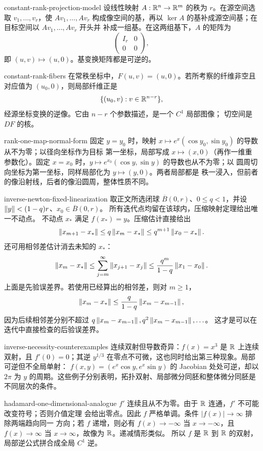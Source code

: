 \begin{solution}{constant-rank-projection-model}
设线性映射 $A:\mathbb{R}^n\to\mathbb{R}^m$ 的秩为 $r$。在源空间选取
$v_1,\ldots,v_r$，使 $Av_1,\ldots,Av_r$ 构成像空间的基，再以
$\ker A$ 的基补成源空间基；在目标空间以 $Av_1,\ldots,Av_r$ 开头并
补成一组基。在这两组基下，$A$ 的矩阵为
\[
 \begin{pmatrix}I_r&0\\0&0\end{pmatrix},
\]
即 $(u,v)\mapsto(u,0)$。基变换矩阵都是可逆的。
\end{solution}

\begin{solution}{constant-rank-fibers}
在常秩坐标中，$F(u,v)=(u,0)$。若所考察的纤维非空且对应值为
$(u_0,0)$，则局部纤维正是
\[
 \{(u_0,v):v\in\mathbb{R}^{n-r}\},
\]
经源坐标变换的逆像。它由 $n-r$ 个参数描述，是一个 $C^1$ 局部图像；
切空间是 $DF$ 的核。
\end{solution}

\begin{solution}{rank-one-map-normal-form}
固定 $y=y_0$ 时，映射
$x\mapsto e^x(\cos y_0,\sin y_0)$ 的导数从不为零；以径向坐标作为目标
第一坐标，局部写成 $x\mapsto(x,0)$（再作一维重参数化）。固定
$x=x_0$ 时，$y\mapsto e^{x_0}(\cos y,\sin y)$ 的导数也从不为零；以
圆周切向坐标为第一坐标，同样局部化为 $y\mapsto(y,0)$。两者局部都是
秩一浸入，但前者的像沿射线，后者的像沿圆周，整体性质不同。
\end{solution}

\begin{solution}{inverse-newton-fixed-linearization}
取正文所选闭球 \(\overline B(0,r)\)、\(0\le q<1\)，并设
\(\left\lVert y\right\rVert<(1-q)r\)、\(x_0\in\overline B(0,r)\)。
所有迭代点均留在该球内，压缩映射定理给出唯一不动点。
不动点 $x_*$ 满足 $f(x_*)=y$。压缩估计直接给出
\[
 \left\lVert x_{m+1}-x_*\right\rVert\le q\left\lVert x_m-x_*\right\rVert\le q^{m+1}\left\lVert x_0-x_*\right\rVert.
\]
还可用相邻差估计消去未知的 $x_*$：
\[
 \left\lVert x_m-x_*\right\rVert
 \le\sum_{j=m}^{\infty}\left\lVert x_{j+1}-x_j\right\rVert
 \le\frac{q^m}{1-q}\left\lVert x_1-x_0\right\rVert.
\]
上面是先验误差界。若使用已经算出的相邻差，则对 \(m\ge1\)，
\[
 \left\lVert x_m-x_*\right\rVert\le\frac{q}{1-q}\left\lVert x_m-x_{m-1}\right\rVert,
\]
因为后续相邻差分别不超过
\(q\left\lVert x_m-x_{m-1}\right\rVert,q^2\left\lVert x_m-x_{m-1}\right\rVert,\ldots\)。
这才是可以在迭代中直接检查的后验误差界。
\end{solution}

\begin{solution}{inverse-necessity-counterexamples}
连续双射但导数奇异：$f(x)=x^3$ 是 $\mathbb{R}$ 上连续双射，且 $f'(0)=0$；其逆
$y^{1/3}$ 在零点不可微，这也同时给出第三种现象。局部可逆但不全局单射：
$f(x,y)=(e^x\cos y,e^x\sin y)$ 的 Jacobian 处处可逆，却以 $2\pi$ 为
$y$ 的周期。这些例子分别表明，拓扑双射、局部微分同胚和整体微分同胚是
不同层次的条件。
\end{solution}

\begin{solution}{hadamard-one-dimensional-analogue}
$f'$ 连续且从不为零。由于 $\mathbb{R}$ 连通，$f'$ 不可能改变符号；否则介值定理
会给出零点。因此 $f$ 严格单调。条件 $|f(x)|\to\infty$ 排除两端趋向同一
方向；若 $f$ 递增，则必有 $f(x)\to-\infty$ 当 $x\to-\infty$，且
$f(x)\to\infty$ 当 $x\to\infty$，故像为 $\mathbb{R}$。递减情形类似。
所以 $f$ 是 $\mathbb{R}$ 到 $\mathbb{R}$ 的双射，局部逆公式拼合成全局 $C^1$ 逆。
\end{solution}

